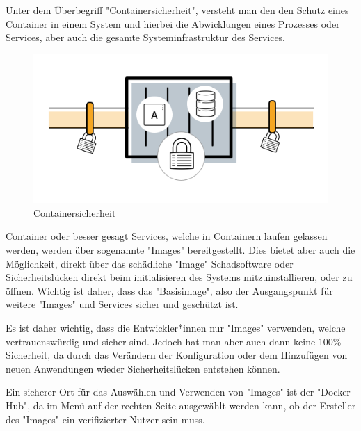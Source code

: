 
Unter dem Überbegriff "Containersicherheit", versteht man den den Schutz eines Container in einem System und hierbei die Abwicklungen eines Prozesses oder Services, aber auch die gesamte Systeminfrastruktur des Services. \cite{ContainerSecurity}

\begin{figure}[H]
    \centering
    \includegraphics[width=\textwidth]{media/DockerAndContainering/Containersicherheit.png}
    \caption{Containersicherheit \cite{ContainerSecurity}}
\end{figure}


Container oder besser gesagt Services, welche in Containern laufen gelassen werden, werden über sogenannte "Images" bereitgestellt. Dies bietet aber auch die Möglichkeit, direkt über das schädliche "Image" Schadsoftware oder Sicherheitslücken direkt beim initialisieren des Systems mitzuinstallieren, oder zu öffnen. Wichtig ist daher, dass das "Basisimage", also der Ausgangspunkt für weitere "Images" und Services sicher und geschützt ist.

Es ist daher wichtig, dass die Entwickler*innen nur "Images" verwenden, welche vertrauenswürdig und sicher sind. Jedoch hat man aber auch dann keine 100\% Sicherheit, da durch das Verändern der Konfiguration oder dem Hinzufügen von neuen Anwendungen wieder Sicherheitslücken entstehen können.

Ein sicherer Ort für das Auswählen und Verwenden von "Images" ist der "Docker Hub", da im Menü auf der rechten Seite ausgewählt werden kann, ob der Ersteller des "Images" ein verifizierter Nutzer sein muss. \cite{ContainerSecurity}

